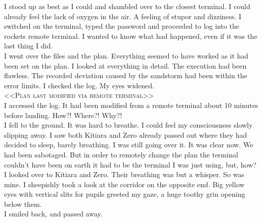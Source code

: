 \documentclass[a4paper,onecolumn,11pt]{article}
\begin{document}
\newline
I stood up as best as I could and shambled over to the closest terminal. I could already feel the lack of oxygen in the air. A feeling of stupor and dizziness. I switched on the terminal, typed the password and proceeded to log into the rockets remote terminal. I wanted to know what had happened, even if it was the last thing I did.\\
\newline
I went over the files and the plan. Everything seemed to have worked as it had been set on the plan. I looked at everything in detail. The execution had been flawless. The recorded deviation caused by the sandstorm had been within the error limits. I checked the log. My eyes widened.\\
\newline
<<\textsc{Plan last modified via remote terminal}>>\\
\newline
I accessed the log. It had been modified from a remote terminal about 10 minutes before landing. How?! Where?! Why?!\\
\newline
I fell to the ground. It was hard to breathe. I could feel my consciousness slowly slipping away. I saw both Kitiara and Zero already passed out where they had decided to sleep, barely breathing. I was still going over it. It was clear now. We had been sabotaged. But in order to remotely change the plan the terminal couldn't have been on earth it had to be the terminal I was just using, but, how?\\
\newline
I looked over to Kitiara and Zero. Their breathing was but a whisper. So was mine. I sheepishly took a look at the corridor on the opposite end. Big yellow eyes with vertical slits for pupils greeted my gaze, a huge toothy grin opening below them.\\ 
\newline
I smiled back, and passed away.

\newpage



\end{document}
